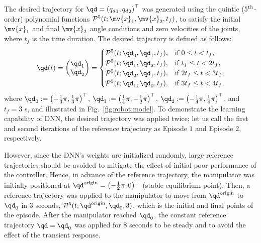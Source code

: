 \documentclass[lettersize,journal]{IEEEtran}
\begin{document}
The desired trajectory for $\qd=\left({q_d}_1,{q_d}_2\right)^\top $ was generated using the quintic (5$\textsuperscript{th}$-order) polynomial functions $\mathcal{P}^5(t;\mv{x}_1,\mv{x}_2,t_f)$, to satisfy the initial $\mv{x}_1$ and final $\mv{x}_2$ angle conditions and zero velocities of the joints, where $t_f$ is the time duration.
The desired trajectory is defined as follows:
\begin{equation}
    \qd(t) 
    =
    \begin{pmatrix}
        {\qd}_1
        \\
        {\qd}_2
    \end{pmatrix}
    =
    \begin{cases}
    \mathcal{P}^5(t;{\qd}_0,{\qd}_1,t_f),
        &
        \text{if } 0 \le t < t_f 
        ,
        \\
    \mathcal{P}^5(t;{\qd}_1,{\qd}_2,t_f),
        &
        \text{if } t_f \le t < 2t_f 
        ,
        \\
    \mathcal{P}^5(t;{\qd}_2,{\qd}_1,t_f),
        & 
        \text{if } 2t_f \le t < 3t_f 
        ,
        \\
    \mathcal{P}^5(t;{\qd}_1,{\qd}_0,t_f),
        &    
        \text{if } 3t_f \le t < 4t_f 
        ,
        \\
    \end{cases}
    \label{eq:desired trajectory}
\end{equation}
where ${\qd}_0:=\left(-\tfrac{1}{3}\pi,\tfrac{1}{3}\pi\right)^\top$, ${\qd}_1:=\left(\tfrac{1}{4}\pi,-\tfrac{1}{2}\pi\right)^\top$, ${\qd}_2:=\left(-\tfrac{1}{4}\pi,\tfrac{1}{4}\pi\right)^\top$, and $t_f=3$ s, and illustrated in Fig.~\ref{fig:robot:model}.
To demonstrate the learning capability of DNN, the desired trajectory was applied twice; let us call the first and second iterations of the reference trajectory as Episode $1$ and Episode $2$, respectively.

However, since the DNN's weights are initialized randomly, large reference trajectories should be avoided to mitigate the effect of initial poor performance of the controller.
Hence, in advance of the reference trajectory, the manipulator was initially positioned at ${\qd}^{\rm{origin}}=\left(-\tfrac{1}{2}\pi,0\right)^\top$ (\ie stable equilibrium point).
Then, a reference trajectory was applied to the manipulator to move from ${\qd}^{\rm{origin}}$ to ${\qd}_0$ in 3 seconds, \ie $\mathcal{P}^5(t;{\qd}^{\rm{origin}},{\qd}_0,3)$, which is the initial and final points of the episode.
After the manipulator reached ${\qd}_0$, the constant reference trajectory $\qd={\qd}_0$ was applied for 8 seconds to be steady and to avoid the effect of the transient response.
\end{document}
